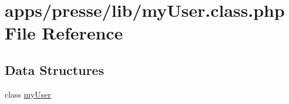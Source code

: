 \hypertarget{presse_2lib_2my_user_8class_8php}{\section{apps/presse/lib/my\-User.class.\-php File Reference}
\label{presse_2lib_2my_user_8class_8php}
}
\subsection*{Data Structures}
\begin{DoxyCompactItemize}
\item 
class \hyperlink{classmy_user}{my\-User}
\end{DoxyCompactItemize}
